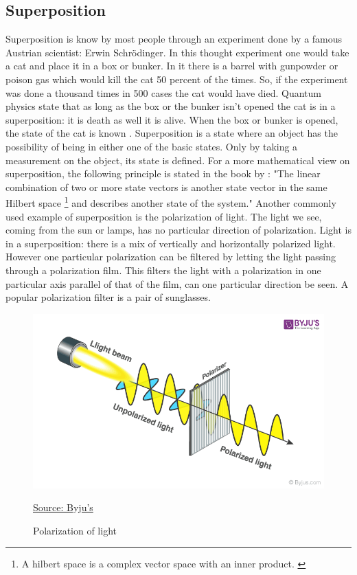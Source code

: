 \subsection{Superposition} \label{superposition}
Superposition is know by most people through an experiment done by a famous Austrian scientist: Erwin Schrödinger.
In this thought experiment one would take a cat and place it in a box or bunker. 
In it there is a barrel with gunpowder or poison gas which would kill the cat 50 percent of the times. So, if the experiment was done a thousand times in 500 cases the cat would have died.
Quantum physics state that as long as the box or the bunker isn't opened the cat is in a superposition: it is death as well it is alive.
When the box or bunker is opened, the state of the cat is known \autocite{Villars_1986}.
Superposition is a state where an object has the possibility of being in either one of the basic states. Only by taking a measurement on the object, its state is defined.
For a more mathematical view on superposition, the following principle is stated in the book by \textcite{Hidary_2019}:
"The linear combination of two or more state vectors is another state vector in the same Hilbert space \footnote{A hilbert space is a complex vector space with an inner product. \autocite{Griffiths2014}} and describes another state of the system."
Another commonly used example of superposition is the polarization of light. The light we see, coming from the sun or lamps, has no particular direction of polarization.
Light is in a superposition: there is a mix of vertically and horizontally polarized light. However one particular polarization can be filtered by letting the light passing through a polarization film.
This filters the light with a polarization in one particular axis parallel of that of the film, can one particular direction be seen.
A popular polarization filter is a pair of sunglasses.

\begin{figure} [h]
    \centering
    \includegraphics[width=\textwidth]{img/Polarization-of-Light-2.png}
        \caption{Polarization of light}
        \label{fig:polarization}
    \href{https://byjus.com/physics/polarization-of-light/}{Source: Byju's}

\end{figure}


